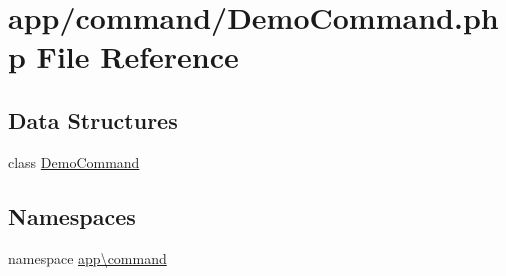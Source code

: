 \hypertarget{_demo_command_8php}{\section{app/command/\-Demo\-Command.php File Reference}
\label{_demo_command_8php}
}
\subsection*{Data Structures}
\begin{DoxyCompactItemize}
\item 
class \hyperlink{classapp_1_1command_1_1_demo_command}{Demo\-Command}
\end{DoxyCompactItemize}
\subsection*{Namespaces}
\begin{DoxyCompactItemize}
\item 
namespace \hyperlink{namespaceapp_1_1command}{app\textbackslash{}command}
\end{DoxyCompactItemize}
